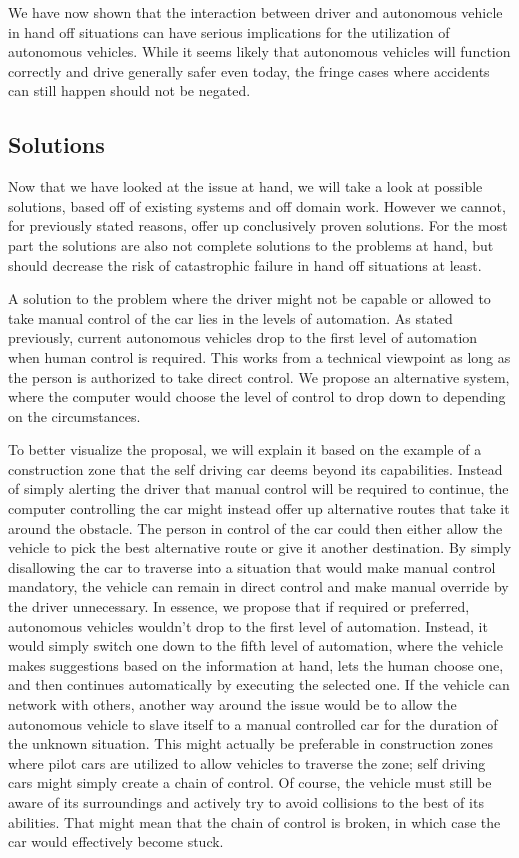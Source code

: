 \documentclass{acm_proc_article-sp}
\begin{document}
We have now shown that the interaction between driver and autonomous vehicle in hand off situations can have serious implications for the utilization of autonomous vehicles.
While it seems likely that autonomous vehicles will function correctly and drive generally safer even today, the fringe cases where accidents can still happen should not be negated.

\subsection{Solutions}
\label{solutions}

Now that we have looked at the issue at hand, we will take a look at possible solutions, based off of existing systems and off domain work.
However we cannot, for previously stated reasons, offer up conclusively proven solutions.
For the most part the solutions are also not complete solutions to the problems at hand, but should decrease the risk of catastrophic failure in hand off situations at least.

A solution to the problem where the driver might not be capable or allowed to take manual control of the car lies in the levels of automation.
As stated previously, current autonomous vehicles drop to the first level of automation when human control is required.
This works from a technical viewpoint as long as the person is authorized to take direct control.
We propose an alternative system, where the computer would choose the level of control to drop down to depending on the circumstances.

To better visualize the proposal, we will explain it based on the example of a construction zone that the self driving car deems beyond its capabilities.
Instead of simply alerting the driver that manual control will be required to continue, the computer controlling the car might instead offer up alternative routes that take it around the obstacle.
The person in control of the car could then either allow the vehicle to pick the best alternative route or give it another destination.
By simply disallowing the car to traverse into a situation that would make manual control mandatory, the vehicle can remain in direct control and make manual override by the driver unnecessary.
In essence, we propose that if required or preferred, autonomous vehicles wouldn't drop to the first level of automation.
Instead, it would simply switch one down to the fifth level of automation, where the vehicle makes suggestions based on the information at hand, lets the human choose one, and then continues automatically by executing the selected one.
If the vehicle can network with others, another way around the issue would be to allow the autonomous vehicle to slave itself to a manual controlled car for the duration of the unknown situation.
This might actually be preferable in construction zones where pilot cars are utilized to allow vehicles to traverse the zone; self driving cars might simply create a chain of control.
Of course, the vehicle must still be aware of its surroundings and actively try to avoid collisions to the best of its abilities.
That might mean that the chain of control is broken, in which case the car would effectively become stuck.
\end{document}
